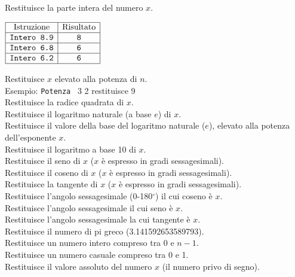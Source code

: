 Restituisce la parte intera del numero $x$.\\
\begin{center}
$\begin{array}{|c|c|}
	\hline \textrm{Istruzione} & \textrm{Risultato} \\ \hline
	\texttt{Intero 8.9} 		& \texttt{8}\\
	\hline
	\texttt{Intero 6.8} 		& \texttt{6} \\
	\hline
	\texttt{Intero 6.2} 		& \texttt{6} \\
	\hline
\end{array}$
\end{center}
 Restituisce $x$ elevato alla potenza di $n$.\\
Esempio: \texttt{Potenza} \ 3 2 restituisce 9\\
Restituisce la radice quadrata di $x$.\\
 Restituisce il logaritmo naturale (a base $e$) di $x$.\\
 Restituisce il valore della base del logaritmo naturale ($e$), elevato alla potenza dell'esponente $x$.\\
 Restituisce il logaritmo a base 10 di $x$.\\
 Restituisce il seno di $x$ ($x$ è espresso in gradi sessagesimali).\\
 Restituisce il coseno di $x$ ($x$ è espresso in gradi sessagesimali).\\
 Restituisce la tangente di $x$ ($x$ è espresso in gradi sessagesimali).\\
 Restituisce l'angolo sessagesimale (0-180$^\circ$) il cui coseno è $x$.\\
 Restituisce l'angolo sessagesimale il cui seno è $x$.\\
 Restituisce l'angolo sessagesimale la cui tangente è $x$.\\
 Restituisce il numero di pi greco (3.141592653589793).\\
 Restituisce un numero intero compreso tra 0 e $n-1$.  \\
 Restituisce un numero casuale compreso tra 0 e 1.  \\
 Restituisce il valore assoluto del numero $x$ (il numero privo di segno).  \\

